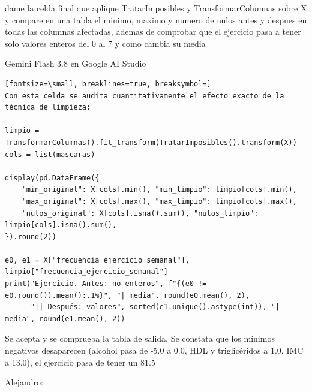 \documentclass[12pt,a4paper,oneside]{book}
\begin{document}
\begin{iaprompt}
dame la celda final que aplique TratarImposibles y TransformarColumnas sobre X y compare en una tabla el minimo, maximo y numero de nulos antes y despues en todas las columnas afectadas, ademas de comprobar que el ejercicio pasa a tener solo valores enteros del 0 al 7 y como cambia su media
\end{iaprompt}
\begin{iaresp}{Gemini Flash 3.8 en Google AI Studio}
\begin{Verbatim}[fontsize=\small, breaklines=true, breaksymbol=]
Con esta celda se audita cuantitativamente el efecto exacto de la técnica de limpieza:

limpio = TransformarColumnas().fit_transform(TratarImposibles().transform(X))
cols = list(mascaras)

display(pd.DataFrame({
    "min_original": X[cols].min(), "min_limpio": limpio[cols].min(),
    "max_original": X[cols].max(), "max_limpio": limpio[cols].max(),
    "nulos_original": X[cols].isna().sum(), "nulos_limpio": limpio[cols].isna().sum(),
}).round(2))

e0, e1 = X["frecuencia_ejercicio_semanal"], limpio["frecuencia_ejercicio_semanal"]
print("Ejercicio. Antes: no enteros", f"{(e0 != e0.round()).mean():.1%}", "| media", round(e0.mean(), 2),
      "|| Después: valores", sorted(e1.unique().astype(int)), "| media", round(e1.mean(), 2))
\end{Verbatim}
\end{iaresp}
\begin{iaanalisis}
Se acepta y se comprueba la tabla de salida. Se constata que los mínimos negativos desaparecen (alcohol pasa de -5.0 a 0.0, HDL y triglicéridos a 1.0, IMC a 13.0), el ejercicio pasa de tener un 81.5%
\end{iaanalisis}

Alejandro:
\end{document}
